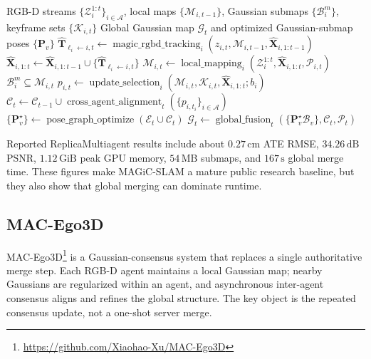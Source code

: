 \documentclass[11pt, a4paper, logo]{googledeepmind}
\begin{document}
\begin{algorithm}[H]
\caption{MAGiC-SLAM}
\label{alg:magic-slam}
\small
\begin{algorithmic}[1]
  \Require RGB-D streams $\{\mathcal{Z}_i^{1:t}\}_{i\in\mathcal{A}}$, local maps $\{\mathcal{M}_{i,t-1}\}$, Gaussian submaps $\{\mathcal{B}_{i}^{m}\}$, keyframe sets $\{\mathcal{K}_{i,t}\}$
  \Ensure Global Gaussian map $\mathcal{G}_t$ and optimized Gaussian-submap poses $\{\mathbf{P}_v\}$
  \State $\hat{\mathbf{T}}_{\ell_i\leftarrow i,t} \gets \operatorname{magic\_rgbd\_tracking}_i(z_{i,t},\mathcal{M}_{i,t-1},\hat{\mathbf{X}}_{i,1:t-1})$ 
  \State $\hat{\mathbf{X}}_{i,1:t} \gets \hat{\mathbf{X}}_{i,1:t-1}\cup\{\hat{\mathbf{T}}_{\ell_i\leftarrow i,t}\}$ 
  \State $\mathcal{M}_{i,t} \gets \operatorname{local\_mapping}_i(\mathcal{Z}_i^{1:t},\hat{\mathbf{X}}_{i,1:t},\mathcal{P}_{i,t})$ 
  \State $\mathcal{B}_{i}^{m} \subseteq \mathcal{M}_{i,t}$ 
  \State $p_{i,t} \gets \operatorname{update\_selection}_i(\mathcal{M}_{i,t},\mathcal{K}_{i,t},\hat{\mathbf{X}}_{i,1:t};b_i)$ 
  \State $\mathcal{C}_t \gets \mathcal{C}_{t-1}\cup\operatorname{cross\_agent\_alignment}_t(\{p_{i,t_i}\}_{i\in\mathcal{A}})$ 
  \State $\{\mathbf{P}_v^\star\} \gets \operatorname{pose\_graph\_optimize}(\mathcal{E}_t\cup\mathcal{C}_t)$ 
  \State $\mathcal{G}_t \gets \operatorname{global\_fusion}_t(\{\mathbf{P}_v^\star\mathcal{B}_v\},\mathcal{C}_t,\mathcal{P}_t)$ 
\end{algorithmic}
\end{algorithm}

Reported ReplicaMultiagent results include about $0.27\,\mathrm{cm}$ ATE RMSE, $34.26\,\mathrm{dB}$ PSNR, $1.12\,\mathrm{GiB}$ peak GPU memory, $54\,\mathrm{MB}$ submaps, and $167\,\mathrm{s}$ global merge time. These figures make MAGiC-SLAM a mature public research baseline, but they also show that global merging can dominate runtime.

\subsection{MAC-Ego3D}
\label{sec:systems:mac-ego3d}

MAC-Ego3D\footnote{\url{https://github.com/Xiaohao-Xu/MAC-Ego3D}} \citep{xu2024mac_ego3d} is a Gaussian-consensus system that replaces a single authoritative merge step. Each RGB-D agent maintains a local Gaussian map; nearby Gaussians are regularized within an agent, and asynchronous inter-agent consensus aligns and refines the global structure. The key object is the repeated consensus update, not a one-shot server merge.
\end{document}
